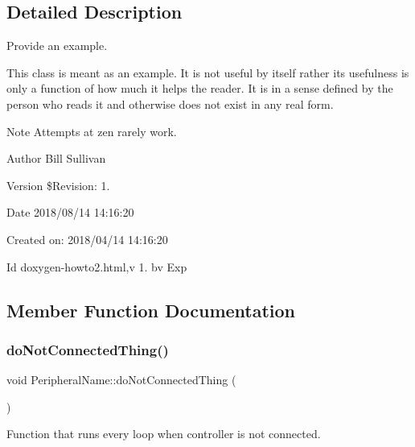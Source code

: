 \subsection{Detailed Description}
Provide an example. 

This class is meant as an example. It is not useful by itself rather its usefulness is only a function of how much it helps the reader. It is in a sense defined by the person who reads it and otherwise does not exist in any real form.

\begin{DoxyNote}{Note}
Attempts at zen rarely work.
\end{DoxyNote}
\begin{DoxyAuthor}{Author}
Bill Sullivan
\end{DoxyAuthor}
\begin{DoxyVersion}{Version}
\$\+Revision\+: 1.
\end{DoxyVersion}
\begin{DoxyDate}{Date}
2018/08/14 14\+:16\+:20
\end{DoxyDate}
Created on\+: 2018/04/14 14\+:16\+:20

\begin{DoxyParagraph}{Id}
doxygen-\/howto2.\+html,v 1. bv Exp 
\end{DoxyParagraph}


\subsection{Member Function Documentation}
\mbox{\label{class_peripheral_name_a63b193d5328d4800de3bb8905f1d2f20}} 
\subsubsection{\texorpdfstring{do\+Not\+Connected\+Thing()}{doNotConnectedThing()}}
{\footnotesize\ttfamily void Peripheral\+Name\+::do\+Not\+Connected\+Thing (\begin{DoxyParamCaption}{ }\end{DoxyParamCaption})\hspace{0.3cm}{\ttfamily [inline]}}



Function that runs every loop when controller is not connected. 

